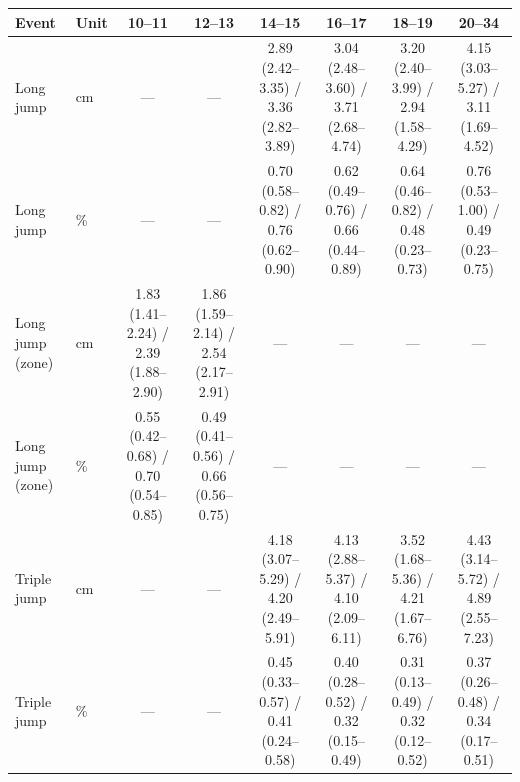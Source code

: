 \begin{tabular}{llcccccc}
\toprule
Event & Unit & 10--11 & 12--13 & 14--15 & 16--17 & 18--19 & 20--34 \\
\midrule
Long jump & cm & --- & --- & 2.89 (2.42--3.35) / 3.36 (2.82--3.89) & 3.04 (2.48--3.60) / 3.71 (2.68--4.74) & 3.20 (2.40--3.99) / 2.94 (1.58--4.29) & 4.15 (3.03--5.27) / 3.11 (1.69--4.52) \\
Long jump & \% & --- & --- & 0.70 (0.58--0.82) / 0.76 (0.62--0.90) & 0.62 (0.49--0.76) / 0.66 (0.44--0.89) & 0.64 (0.46--0.82) / 0.48 (0.23--0.73) & 0.76 (0.53--1.00) / 0.49 (0.23--0.75) \\
Long jump (zone) & cm & 1.83 (1.41--2.24) / 2.39 (1.88--2.90) & 1.86 (1.59--2.14) / 2.54 (2.17--2.91) & --- & --- & --- & --- \\
Long jump (zone) & \% & 0.55 (0.42--0.68) / 0.70 (0.54--0.85) & 0.49 (0.41--0.56) / 0.66 (0.56--0.75) & --- & --- & --- & --- \\
Triple jump & cm & --- & --- & 4.18 (3.07--5.29) / 4.20 (2.49--5.91) & 4.13 (2.88--5.37) / 4.10 (2.09--6.11) & 3.52 (1.68--5.36) / 4.21 (1.67--6.76) & 4.43 (3.14--5.72) / 4.89 (2.55--7.23) \\
Triple jump & \% & --- & --- & 0.45 (0.33--0.57) / 0.41 (0.24--0.58) & 0.40 (0.28--0.52) / 0.32 (0.15--0.49) & 0.31 (0.13--0.49) / 0.32 (0.12--0.52) & 0.37 (0.26--0.48) / 0.34 (0.17--0.51) \\
\bottomrule
\end{tabular}
